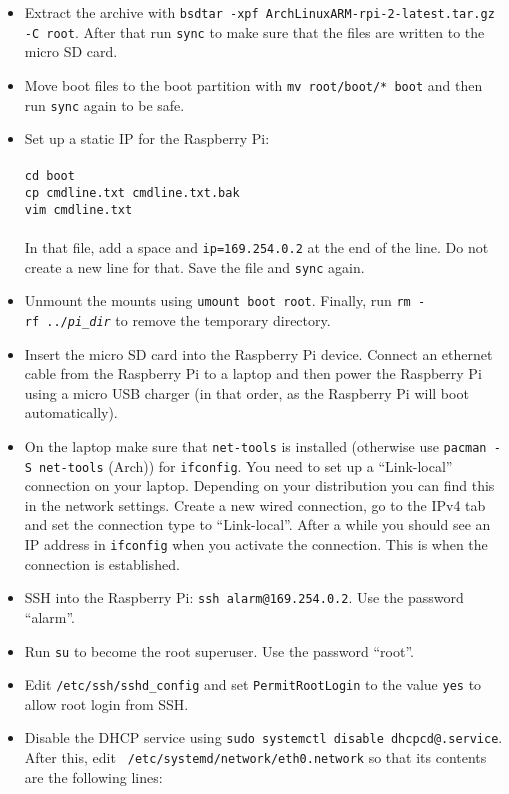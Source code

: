 \documentclass{article}
\newcommand{\arch}{{\color{red} (Arch)}}
\begin{document}
\begin{itemize}
    \item Extract the archive with {\tt bsdtar -xpf 
          ArchLinuxARM-rpi-2-latest.tar.gz -C root}.
          After that run {\tt sync} to make sure that the files are written to 
          the micro SD card.
    \item Move boot files to the boot partition with {\tt mv root/boot/* boot} 
          and then run {\tt sync} again to be safe.
    \item Set up a static IP for the Raspberry Pi: \\\\
          {\tt cd boot} \\
          {\tt cp cmdline.txt cmdline.txt.bak} \\
          {\tt vim cmdline.txt} \\\\
          In that file, add a space and {\tt ip=169.254.0.2} at the end of the 
          line. Do not create a new line for that. Save the file and {\tt sync} 
          again.
    \item Unmount the mounts using {\tt umount boot root}. Finally, run {\tt rm 
          -rf~../\emph{pi\_dir}} to remove the temporary directory.
    \item Insert the micro SD card into the Raspberry Pi device. Connect an 
          ethernet cable from the Raspberry Pi to a laptop and then power the 
          Raspberry Pi using a micro USB charger (in that order, as the 
          Raspberry Pi will boot automatically).
    \item On the laptop make sure that {\tt net-tools} is installed (otherwise 
          use {\tt pacman -S net-tools} \arch{}) for {\tt ifconfig}. You need 
          to set up a ``Link-local'' connection on your laptop. Depending on 
          your distribution you can find this in the network settings. Create 
          a new wired connection, go to the IPv4 tab and set the connection 
          type to ``Link-local''. After a while you should see an IP address in 
          {\tt ifconfig} when you activate the connection. This is when the 
          connection is established.
    \item SSH into the Raspberry Pi: {\tt ssh alarm@169.254.0.2}. Use the 
          password ``alarm''.
    \item Run {\tt su} to become the root superuser. Use the password ``root''.
    \item Edit {\tt /etc/ssh/sshd\_config} and set {\tt PermitRootLogin} to the 
          value {\tt yes} to allow root login from SSH\@.
    \item Disable the DHCP service using {\tt sudo systemctl disable 
          dhcpcd@.service}. After this, edit {\tt 
          /etc/systemd/network/eth0.network} so that its contents are the 
          following lines:


\end{itemize}
\end{document}
